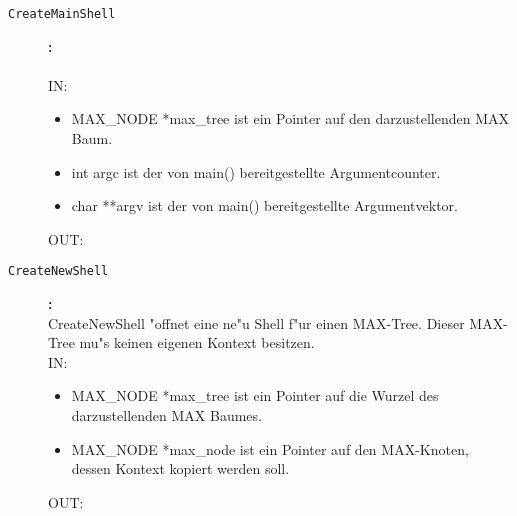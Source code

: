 \begin{description}
\item[\tt CreateMainShell]{\bf :\\}
  \\
IN:
\begin{itemize}
   \item MAX\_NODE *max\_tree ist ein Pointer auf den darzustellenden MAX Baum.
   \item int argc ist der von main() bereitgestellte Argumentcounter.
   \item char **argv ist der von main() bereitgestellte Argumentvektor.
\end{itemize}
OUT:

\item[\tt CreateNewShell]{\bf :\\}
CreateNewShell "offnet eine ne"u Shell f"ur einen MAX-Tree. Dieser MAX-Tree mu"s keinen eigenen Kontext besitzen. \\
IN:
\begin{itemize}
   \item MAX\_NODE *max\_tree ist ein Pointer auf die Wurzel des darzustellenden MAX Baumes.
   \item MAX\_NODE *max\_node ist ein Pointer auf den MAX-Knoten, dessen Kontext kopiert werden soll.
\end{itemize}
OUT:
\end{description}
